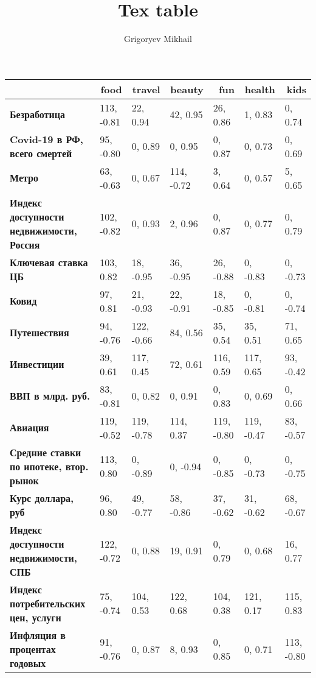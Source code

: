 \documentclass[12pt, a4paper]{article}
\author{Grigoryev Mikhail}
\title{Tex table}
\begin{document}
\thispagestyle{empty}

{\footnotesize
\begin{center}
\begin{tabular}{lllllll}
	\hline
\multicolumn{1}{r}{\textbf{}} & \multicolumn{1}{r}{\textbf{food}} & \multicolumn{1}{r}{\textbf{travel}} & \multicolumn{1}{r}{\textbf{beauty}} & \multicolumn{1}{r}{\textbf{fun}} & \multicolumn{1}{r}{\textbf{health}} & \multicolumn{1}{r}{\textbf{kids}} \\ \hline
\textbf{Безработица} & 113, -0.81 & 22, 0.94 & 42, 0.95 & 26, 0.86 & 1, 0.83 & 0, 0.74 \\
\textbf{Covid-19 в РФ, всего смертей} & 95, -0.80 & 0, 0.89 & 0, 0.95 & 0, 0.87 & 0, 0.73 & 0, 0.69 \\
\textbf{Метро} & 63, -0.63 & 0, 0.67 & 114, -0.72 & 3, 0.64 & 0, 0.57 & 5, 0.65 \\
\textbf{Индекс доступности недвижимости, Россия} & 102, -0.82 & 0, 0.93 & 2, 0.96 & 0, 0.87 & 0, 0.77 & 0, 0.79 \\
\textbf{Ключевая ставка ЦБ} & 103, 0.82 & 18, -0.95 & 36, -0.95 & 26, -0.88 & 0, -0.83 & 0, -0.73 \\
\textbf{Ковид} & 97, 0.81 & 21, -0.93 & 22, -0.91 & 18, -0.85 & 0, -0.81 & 0, -0.74 \\
\textbf{Путешествия} & 94, -0.76 & 122, -0.66 & 84, 0.56 & 35, 0.54 & 35, 0.51 & 71, 0.65 \\
\textbf{Инвестиции} & 39, 0.61 & 117, 0.45 & 72, 0.61 & 116, 0.59 & 117, 0.65 & 93, -0.42 \\
\textbf{ВВП в млрд. руб.} & 83, -0.81 & 0, 0.82 & 0, 0.91 & 0, 0.83 & 0, 0.69 & 0, 0.66 \\
\textbf{Авиация} & 119, -0.52 & 119, -0.78 & 114, 0.37 & 119, -0.80 & 119, -0.47 & 83, -0.57 \\
\textbf{Средние ставки по ипотеке, втор. рынок} & 113, 0.80 & 0, -0.89 & 0, -0.94 & 0, -0.85 & 0, -0.73 & 0, -0.75 \\
\textbf{Курс доллара, руб} & 96, 0.80 & 49, -0.77 & 58, -0.86 & 37, -0.62 & 31, -0.62 & 68, -0.67 \\
\textbf{Индекс доступности недвижимости, СПБ} & 122, -0.72 & 0, 0.88 & 19, 0.91 & 0, 0.79 & 0, 0.68 & 16, 0.77 \\
\textbf{Индекс потребительских цен, услуги} & 75, -0.74 & 104, 0.53 & 122, 0.68 & 104, 0.38 & 121, 0.17 & 115, 0.83 \\
\textbf{Инфляция в процентах годовых} & 91, -0.76 & 0, 0.87 & 8, 0.93 & 0, 0.85 & 0, 0.71 & 113, -0.80 \\

\end{tabular}
\end{center}}
\end{document}
